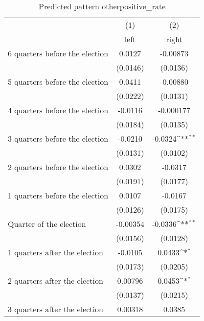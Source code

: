 \begin{table}[htbp]\centering
\def\sym#1{\ifmmode^{#1}\else\(^{#1}\)\fi}
\caption{Predicted pattern otherpositive\_rate}
\begin{tabular}{l*{2}{c}}
\hline\hline
                    &\multicolumn{1}{c}{(1)}&\multicolumn{1}{c}{(2)}\\
                    &\multicolumn{1}{c}{left}&\multicolumn{1}{c}{right}\\
\hline
 6 quarters before the election&      0.0127         &    -0.00873         \\
                    &    (0.0146)         &    (0.0136)         \\
[1em]
 5 quarters before the election&      0.0411         &    -0.00880         \\
                    &    (0.0222)         &    (0.0131)         \\
[1em]
 4 quarters before the election&     -0.0116         &   -0.000177         \\
                    &    (0.0184)         &    (0.0135)         \\
[1em]
 3 quarters before the election&     -0.0210         &     -0.0324\sym{**} \\
                    &    (0.0131)         &    (0.0102)         \\
[1em]
 2 quarters before the election&      0.0302         &     -0.0317         \\
                    &    (0.0191)         &    (0.0177)         \\
[1em]
 1 quarters before the election&      0.0107         &     -0.0167         \\
                    &    (0.0126)         &    (0.0175)         \\
[1em]
Quarter of the election&    -0.00354         &     -0.0336\sym{**} \\
                    &    (0.0156)         &    (0.0128)         \\
[1em]
 1 quarters after the election&     -0.0105         &      0.0433\sym{*}  \\
                    &    (0.0173)         &    (0.0205)         \\
[1em]
 2 quarters after the election&     0.00796         &      0.0453\sym{*}  \\
                    &    (0.0137)         &    (0.0215)         \\
[1em]
 3 quarters after the election&     0.00318         &      0.0385         \\

\end{tabular}
\end{table}
